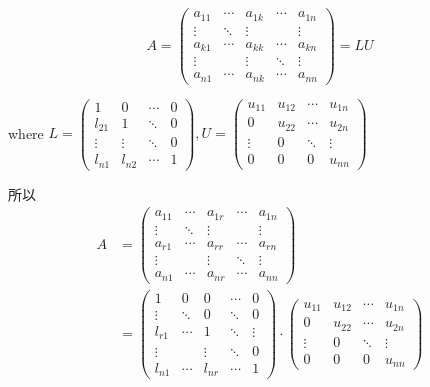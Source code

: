 \begin{definition}[$A$的LU分解]
    $$ A=\left(\begin{array}{ccccc}a_{11} & \cdots & a_{1 k} & \cdots & a_{1 n} \\ \vdots & \ddots & \vdots & & \vdots \\ a_{k 1} & \cdots & a_{k k} & \cdots & a_{k n} \\ \vdots & & \vdots & \ddots & \vdots \\ a_{n 1} & \cdots & a_{n k} & \cdots & a_{n n}\end{array}\right) =LU $$

    where $ L=\left(\begin{array}{cccc}1 & 0 & \cdots & 0 \\ l_{21} & 1 & \ddots & 0 \\ \vdots & \vdots & \ddots & 0 \\ l_{n 1} & l_{n 2} & \cdots & 1\end{array}\right) , U=\left(\begin{array}{cccc}u_{11} & u_{12} & \cdots & u_{1 n} \\ 0 & u_{22} & \cdots & u_{2 n} \\ \vdots & 0 & \ddots & \vdots \\ 0 & 0 & 0 & u_{n n}\end{array}\right) $
\end{definition}

所以
$$
    \begin{aligned}
        A & =\left(\begin{array}{ccccc}a_{11} & \cdots & a_{1 r} & \cdots & a_{1 n} \\ \vdots & \ddots & \vdots & & \vdots \\ a_{r 1} & \cdots & a_{r r} & \cdots & a_{r n} \\ \vdots & & \vdots & \ddots & \vdots \\ a_{n 1} & \cdots & a_{n r} & \cdots & a_{n n}\end{array}\right)                                               \\
          & =\left(\begin{array}{ccccc}1 & 0 & 0 & \cdots & 0 \\ \vdots & \ddots & 0 & \ddots & 0 \\ l_{r 1} & \cdots & 1 & \ddots & \vdots \\ \vdots & & \vdots & \ddots & 0 \\ l_{n 1} & \cdots & l_{n r} & \cdots & 1\end{array}\right) \cdot \left(\begin{array}{cccc}u_{11} & u_{12} & \cdots & u_{1 n} \\ 0 & u_{22} & \cdots & u_{2 n} \\ \vdots & 0 & \ddots & \vdots \\ 0 & 0 & 0 & u_{n n}\end{array}\right)
    \end{aligned}
$$

